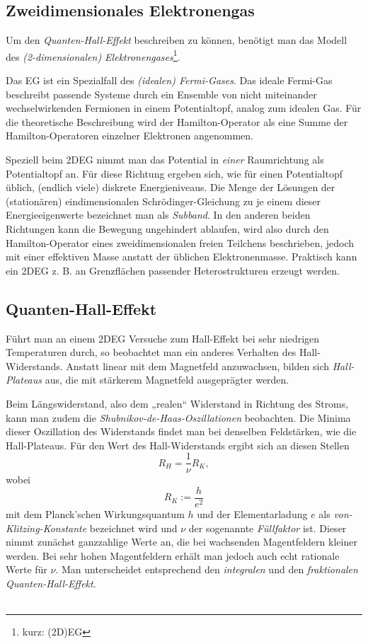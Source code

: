 \subsection{Zweidimensionales Elektronengas}
Um den \emph{Quanten-Hall-Effekt} beschreiben zu können, benötigt man das Modell des \emph{(2-dimensionalen) Elektronengases}\footnote{kurz: (2D)EG}.

Das EG ist ein Spezialfall des \emph{(idealen) Fermi-Gases}. Das ideale Fermi-Gas beschreibt passende Systeme durch ein Ensemble von nicht miteinander wechselwirkenden Fermionen in einem Potentialtopf, analog zum idealen Gas.
Für die theoretische Beschreibung wird der Hamilton-Operator als eine Summe der Hamilton-Operatoren einzelner Elektronen angenommen.

Speziell beim 2DEG nimmt man das Potential in \emph{einer} Raumrichtung als Potentialtopf an. Für diese Richtung ergeben sich, wie für einen Potentialtopf üblich, (endlich viele) diskrete Energieniveaus. Die Menge der Lösungen der (stationären) eindimensionalen Schrödinger-Gleichung zu je einem dieser Energieeigenwerte bezeichnet man als \emph{Subband}.
In den anderen beiden Richtungen kann die Bewegung ungehindert ablaufen, wird also durch den Hamilton-Operator eines zweidimensionalen freien Teilchens beschrieben, jedoch mit einer effektiven Masse anstatt der üblichen Elektronenmasse.
Praktisch kann ein 2DEG z. B. an Grenzflächen passender Heterostrukturen erzeugt werden.

\clearpage

\subsection{Quanten-Hall-Effekt}\label{sec:Quanten-Hall-Effekt}
Führt man an einem 2DEG Versuche zum Hall-Effekt bei sehr niedrigen Temperaturen durch, so beobachtet man ein anderes Verhalten des Hall-Widerstands. Anstatt linear mit dem Magnetfeld anzuwachsen, bilden sich \emph{Hall-Plateaus} aus, die mit stärkerem Magnetfeld ausgeprägter werden.

Beim Längswiderstand, also dem „realen“ Widerstand in Richtung des Stroms, kann man zudem die \emph{Shubnikov-de-Haas-Oszillationen} beobachten. Die Minima dieser Oszillation des Widerstands findet man bei denselben Feldstärken, wie die Hall-Plateaus. Für den Wert des Hall-Widerstands ergibt sich an diesen Stellen
\begin{equation}\label{eq:HallvKl}
R_H = \frac{1}{\nu}R_K,
\end{equation}
wobei
\begin{equation}\label{eq:vKlitzing}
R_K := \frac{h}{e^2}
\end{equation}
mit dem Planck'schen Wirkungsquantum $h$ und der Elementarladung $e$ als \emph{von-Klitzing-Konstante} bezeichnet wird und $\nu$ der sogenannte \emph{Füllfaktor} ist. Dieser nimmt zunächst ganzzahlige Werte an, die bei wachsenden Magentfeldern kleiner werden. Bei sehr hohen Magentfeldern erhält man jedoch auch echt rationale Werte für $\nu$. Man unterscheidet entsprechend den \emph{integralen} und den \emph{fraktionalen Quanten-Hall-Effekt}.
\\\\

